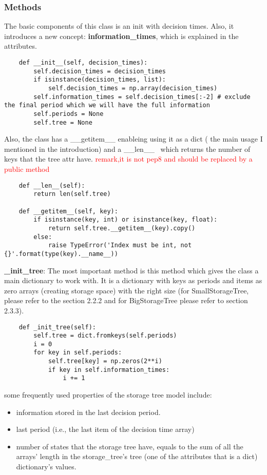 \documentclass[12pt]{article}
\newcommand{\tc}{\textcolor{red}}
\begin{document}
\subsubsection{Methods}
The basic components of this class is an init with decision times. Also, it introduces a new concept: \textbf{information\_times}, which is explained in the attributes.\\
\begin{verbatim}
	def __init__(self, decision_times):
		self.decision_times = decision_times
		if isinstance(decision_times, list):
			self.decision_times = np.array(decision_times)
		self.information_times = self.decision_times[:-2] # exclude the final period which we will have the full information
		self.periods = None
		self.tree = None
\end{verbatim}
Also, the class has a \_\_getitem\_\_ enableing using it as a dict ( the main usage I mentioned in the introduction) and a \_\_len\_\_ \ which returns the number of keys that the tree attr have. \tc{remark,it is not pep8 and should be replaced by a public method}
\begin{verbatim}
	def __len__(self):
		return len(self.tree)

	def __getitem__(self, key):
		if isinstance(key, int) or isinstance(key, float):
			return self.tree.__getitem__(key).copy()
		else:
			raise TypeError('Index must be int, not {}'.format(type(key).__name__))
\end{verbatim}
\textbf{\_init\_tree}: The most important method is this method which gives the class a main dictionary to work with. It is a dictionary with keys as periods and items as zero arrays (creating storage space) with the right size (for SmallStorageTree, please refer to the section 2.2.2 and for BigStorageTree please refer to section 2.3.3).
\begin{verbatim}
	def _init_tree(self):
		self.tree = dict.fromkeys(self.periods)
		i = 0
		for key in self.periods:
			self.tree[key] = np.zeros(2**i)
			if key in self.information_times:
				i += 1
\end{verbatim}
some frequently used properties of the storage tree model include:
\begin{itemize}
  \item information stored in the last decision period.
  \item last period (i.e., the last item of the decision time array)
  \item number of states that the storage tree have, equals to the sum of all the arrays' length in the storage\_tree's tree (one of the attributes that is a dict) dictionary's values.
\end{itemize}
\end{document}
